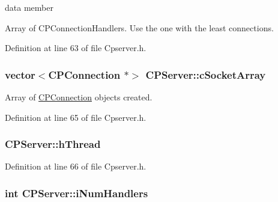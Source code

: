 data member 

\-Array of \-C\-P\-Connection\-Handlers. \-Use the one with the least connections. 

\-Definition at line 63 of file \-Cpserver.\-h.

\hypertarget{class_c_p_server_a5529eba58fcaf14f96b39895520b5468}{
\subsubsection[{c\-Socket\-Array}]{\setlength{\rightskip}{0pt plus 5cm}vector$<${\bf \-C\-P\-Connection} $\ast$$>$ {\bf \-C\-P\-Server\-::c\-Socket\-Array}}}\label{class_c_p_server_a5529eba58fcaf14f96b39895520b5468}


\-Array of \hyperlink{class_c_p_connection}{\-C\-P\-Connection} objects created. 



\-Definition at line 65 of file \-Cpserver.\-h.

\hypertarget{class_c_p_server_aaff398bbe130c88c778231fb9dc163c6}{
\subsubsection[{h\-Thread}]{ {\bf \-C\-P\-Server\-::h\-Thread}}}\label{class_c_p_server_aaff398bbe130c88c778231fb9dc163c6}


\-Definition at line 66 of file \-Cpserver.\-h.

\hypertarget{class_c_p_server_a1d016fb3e151466593bc3c16941bd222}{
\subsubsection[{i\-Num\-Handlers}]{\setlength{\rightskip}{0pt plus 5cm}int {\bf \-C\-P\-Server\-::i\-Num\-Handlers}}}\label{class_c_p_server_a1d016fb3e151466593bc3c16941bd222}


